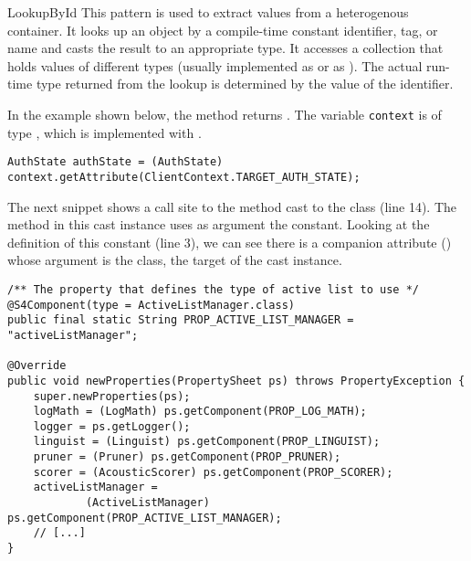 \begin{pattern}{LookupById}
This pattern is used to extract values from a heterogenous container.
It looks up an object by a compile-time constant identifier, tag, or name and casts the result to an appropriate type.
It accesses a collection that holds values of different types
(usually implemented as  or as ).
The actual run-time type returned from the lookup is determined by the value of the identifier.

\instances{}
In the example shown below,%
\def\urlvar{http://bit.ly/loopj_android_async_http_2SUzY4E}
the  method returns .
The variable \texttt{context} is of type ,
which is implemented with .

\begin{verbatim}
AuthState authState = (AuthState) context.getAttribute(ClientContext.TARGET_AUTH_STATE);
\end{verbatim}

The next snippet%
\def\urlvar{http://bit.ly/skerit_cmusphinx_2HGgL1D}
shows a call site to the  method cast to the  class (line 14).
The  method in this cast instance uses as argument the  constant.
Looking at the definition of this constant (line 3),
we can see there is a companion attribute () whose argument is the  class, the target of the cast instance.

\begin{verbatim}
/** The property that defines the type of active list to use */
@S4Component(type = ActiveListManager.class)
public final static String PROP_ACTIVE_LIST_MANAGER = "activeListManager";

@Override
public void newProperties(PropertySheet ps) throws PropertyException {
    super.newProperties(ps);
    logMath = (LogMath) ps.getComponent(PROP_LOG_MATH);
    logger = ps.getLogger();
    linguist = (Linguist) ps.getComponent(PROP_LINGUIST);
    pruner = (Pruner) ps.getComponent(PROP_PRUNER);
    scorer = (AcousticScorer) ps.getComponent(PROP_SCORER);
    activeListManager = 
            (ActiveListManager) ps.getComponent(PROP_ACTIVE_LIST_MANAGER);
    // [...]
}
\end{verbatim}


\end{pattern}
